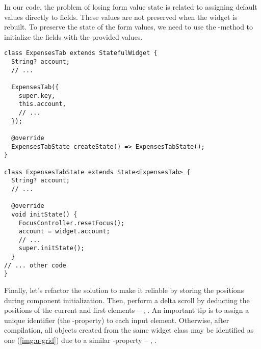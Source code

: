 In our code, the problem of losing form value state is related to assigning default values directly to fields. These 
values are not preserved when the widget is rebuilt. To preserve the state of the form values, we need to use the 
-method to initialize the fields with the provided values.

\begin{lstlisting}
class ExpensesTab extends StatefulWidget {
  String? account;
  // ...

  ExpensesTab({
    super.key,
    this.account,
    // ...
  });

  @override
  ExpensesTabState createState() => ExpensesTabState();
}

class ExpensesTabState extends State<ExpensesTab> {
  String? account;
  // ...

  @override
  void initState() {
    FocusController.resetFocus();
    account = widget.account;
    // ...
    super.initState();
  }
// ... other code
}
\end{lstlisting}

\noindent Finally, let's refactor the solution to make it reliable by storing the positions during component 
initialization. Then, perform a delta scroll by deducting the positions of the current and first elements -- 
, . An important tip is to assign a unique identifier (the -property) to each 
input element. Otherwise, after compilation, all objects created from the same widget class may be identified as one (\cref{img:u-grid}) due to a similar -property -- , .


